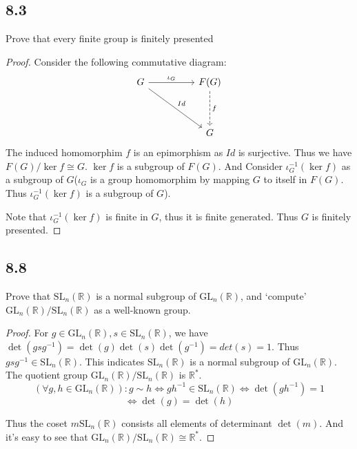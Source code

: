 \documentclass[a4paper, pdf, 12pt]{article}
\begin{document}
\subsection*{8.3}
Prove that every finite group is finitely presented
\begin{proof}
  Consider the following commutative diagram:
  $$
  \begin{tikzcd}[row sep = huge, column sep = huge]
    G \ar[rd, "Id"] \ar[r, "\iota_{G}"]& F(G)\ar[d, dashed, "f"]\\
      & G
  \end{tikzcd}
  $$
  The induced homomorphim $f$ is an epimorphism as $Id$ is surjective. Thus we 
  have $F(G)/\ker f\cong G$. $\ker f$ is a subgroup of $F(G)$. And Consider 
  $\iota_{G}^{-1}(\ker f)$ as a subgroup of $G$($\iota_{G}$ is a group homomorphim by 
  mapping $G$ to itself in $F(G)$. Thus $\iota_{G}^{-1}(\ker f)$ is a subgroup of $G$).

  Note that $\iota_{G}^{-1}(\ker f)$ is finite in $G$, thus it is finite generated. Thus $G$ is finitely 
  presented.
\end{proof}

\subsection*{8.8}
Prove that $\mbox{SL}_n(\mathbb{R})$ is a normal subgroup of $\mbox{GL}_n(\mathbb{R})$, and ‘compute’ $\mbox{GL}_n(\mathbb{R})/ \mbox{SL}_n(\mathbb{R})$ as a well-known group.
\begin{proof}
  For $g\in \mbox{GL}_{n}(\mathbb{R}), s\in \mbox{SL}_{n}(\mathbb{R})$, we have $\det (gsg^{-1}) = \det(g)\det(s)\det(g^{-1}) = det(s) = 1$.
  Thus $gsg^{-1}\in \mbox{SL}_{n}(\mathbb{R})$. This indicates $\mbox{SL}_{n}(\mathbb{R})$ is a normal subgroup of $\mbox{GL}_{n}(\mathbb{R})$.
  The quotient group $\mbox{GL}_{n}(\mathbb{R})/\mbox{SL}_{n}(\mathbb{R})$ is $\mathbb{R}^{*}$. 
  $$
  (\forall g,h\in \mbox{GL}_{n}(\mathbb{R})): g\sim h\Longleftrightarrow gh^{-1} \in \mbox{SL}_{n}(\mathbb{R})
  \Longleftrightarrow \det(gh^{-1}) = 1$$
  $$ 
  \Longleftrightarrow \det(g) = \det(h)
  $$

  Thus the coset $m\mbox{SL}_{n}(\mathbb{R})$ consists all elements of determinant $\det(m)$. And it's easy to 
  see that $\mbox{GL}_n(\mathbb{R})/ \mbox{SL}_n(\mathbb{R})\cong \mathbb{R}^{*}$.
\end{proof}
\end{document}
